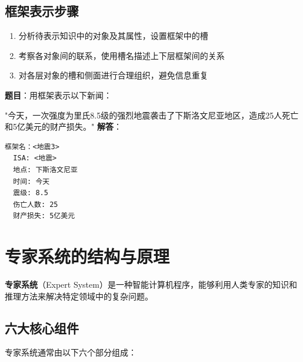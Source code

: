 \subsection{框架表示步骤}
\begin{enumerate}[leftmargin=2em,itemsep=0pt]
    \item 分析待表示知识中的对象及其属性，设置框架中的槽
    \item 考察各对象间的联系，使用槽名描述上下层框架间的关系
    \item 对各层对象的槽和侧面进行合理组织，避免信息重复
\end{enumerate}

\begin{examplebox}[例题2.2 框架表示]
\textbf{题目}：用框架表示以下新闻：

"今天，一次强度为里氏8.5级的强烈地震袭击了下斯洛文尼亚地区，造成25人死亡和5亿美元的财产损失。"
\tcblower
\textbf{解答}：
\begin{lstlisting}
框架名：<地震3>
  ISA: <地震>
  地点: 下斯洛文尼亚
  时间: 今天
  震级: 8.5
  伤亡人数: 25
  财产损失: 5亿美元
\end{lstlisting}
\end{examplebox}

\section{专家系统的结构与原理}

\begin{conceptbox}
\textbf{专家系统}（Expert System）是一种智能计算机程序，能够利用人类专家的知识和推理方法来解决特定领域中的复杂问题。
\end{conceptbox}

\subsection{六大核心组件}

专家系统通常由以下六个部分组成：

